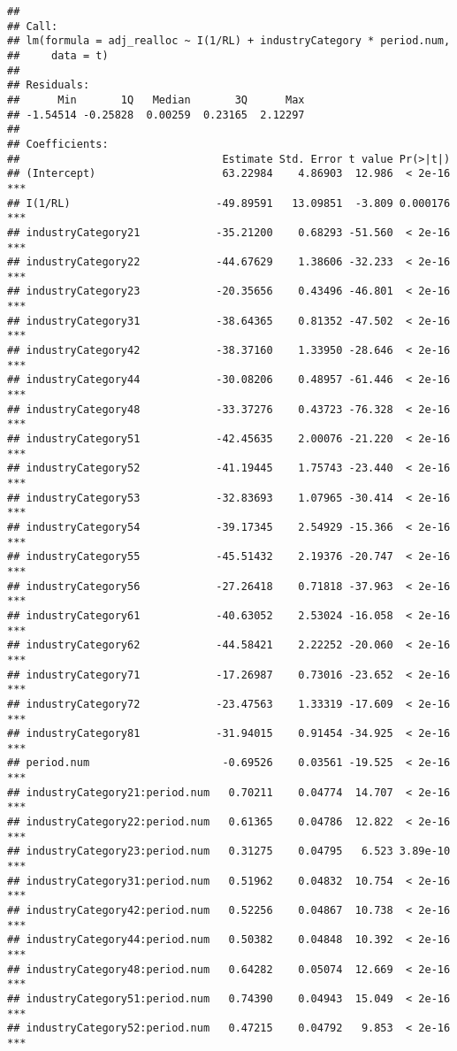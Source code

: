 \documentclass[
]{article}
\begin{document}
\begin{verbatim}
## 
## Call:
## lm(formula = adj_realloc ~ I(1/RL) + industryCategory * period.num, 
##     data = t)
## 
## Residuals:
##      Min       1Q   Median       3Q      Max 
## -1.54514 -0.25828  0.00259  0.23165  2.12297 
## 
## Coefficients:
##                                Estimate Std. Error t value Pr(>|t|)    
## (Intercept)                    63.22984    4.86903  12.986  < 2e-16 ***
## I(1/RL)                       -49.89591   13.09851  -3.809 0.000176 ***
## industryCategory21            -35.21200    0.68293 -51.560  < 2e-16 ***
## industryCategory22            -44.67629    1.38606 -32.233  < 2e-16 ***
## industryCategory23            -20.35656    0.43496 -46.801  < 2e-16 ***
## industryCategory31            -38.64365    0.81352 -47.502  < 2e-16 ***
## industryCategory42            -38.37160    1.33950 -28.646  < 2e-16 ***
## industryCategory44            -30.08206    0.48957 -61.446  < 2e-16 ***
## industryCategory48            -33.37276    0.43723 -76.328  < 2e-16 ***
## industryCategory51            -42.45635    2.00076 -21.220  < 2e-16 ***
## industryCategory52            -41.19445    1.75743 -23.440  < 2e-16 ***
## industryCategory53            -32.83693    1.07965 -30.414  < 2e-16 ***
## industryCategory54            -39.17345    2.54929 -15.366  < 2e-16 ***
## industryCategory55            -45.51432    2.19376 -20.747  < 2e-16 ***
## industryCategory56            -27.26418    0.71818 -37.963  < 2e-16 ***
## industryCategory61            -40.63052    2.53024 -16.058  < 2e-16 ***
## industryCategory62            -44.58421    2.22252 -20.060  < 2e-16 ***
## industryCategory71            -17.26987    0.73016 -23.652  < 2e-16 ***
## industryCategory72            -23.47563    1.33319 -17.609  < 2e-16 ***
## industryCategory81            -31.94015    0.91454 -34.925  < 2e-16 ***
## period.num                     -0.69526    0.03561 -19.525  < 2e-16 ***
## industryCategory21:period.num   0.70211    0.04774  14.707  < 2e-16 ***
## industryCategory22:period.num   0.61365    0.04786  12.822  < 2e-16 ***
## industryCategory23:period.num   0.31275    0.04795   6.523 3.89e-10 ***
## industryCategory31:period.num   0.51962    0.04832  10.754  < 2e-16 ***
## industryCategory42:period.num   0.52256    0.04867  10.738  < 2e-16 ***
## industryCategory44:period.num   0.50382    0.04848  10.392  < 2e-16 ***
## industryCategory48:period.num   0.64282    0.05074  12.669  < 2e-16 ***
## industryCategory51:period.num   0.74390    0.04943  15.049  < 2e-16 ***
## industryCategory52:period.num   0.47215    0.04792   9.853  < 2e-16 ***

\end{verbatim}
\end{document}

